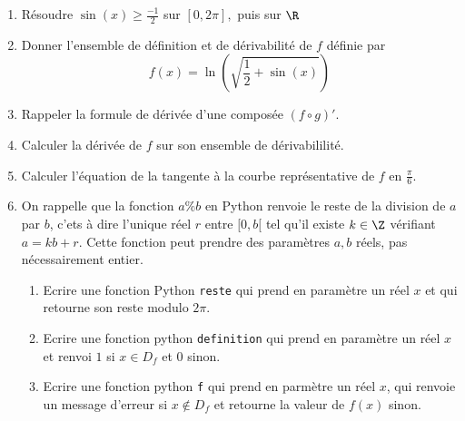 


\begin{exercice}
\begin{enumerate}
\item Résoudre $\sin(x) \geq \frac{-1}{2} $ sur $[0,2\pi],$ puis sur $\R$
\item Donner l'ensemble de définition et de dérivabilité de $f$ définie par 
$$ f(x) = \ln\left(\sqrt{\frac{1}{2}+ \sin(x)}\right)$$
\item Rappeler la formule de dérivée d'une composée $(f\circ g) '$. 
\item Calculer la dérivée de $f$ sur son ensemble de dérivabililité. 
\item Calculer l'équation de la tangente à la courbe représentative de $f$ en $\frac{\pi}{6}$. 
\item On rappelle que la fonction $a\% b$ en Python renvoie le reste de la division de $a$ par $b$, c'ets à dire l'unique réel $r$ entre $[0,b[$ tel qu'il existe $k\in \Z$ vérifiant $a= kb+r$. Cette fonction  peut prendre des paramètres $a,b$ réels, pas nécessairement entier. 
\begin{enumerate}
\item Ecrire une fonction Python \texttt{reste} qui prend en paramètre un réel $x$ et qui retourne son reste modulo $2\pi$. 
\item Ecrire une fonction python  \texttt{definition} qui prend en paramètre un réel $x$ et renvoi $1$ si $x\in D_f$ et $0$ sinon. 
\item Ecrire une fonction python \texttt{f} qui prend en parmètre un réel $x$, qui renvoie un message d'erreur si $x\notin D_f$ et retourne la valeur de $f(x)$ sinon.  
\end{enumerate}
\end{enumerate}

\end{exercice}
